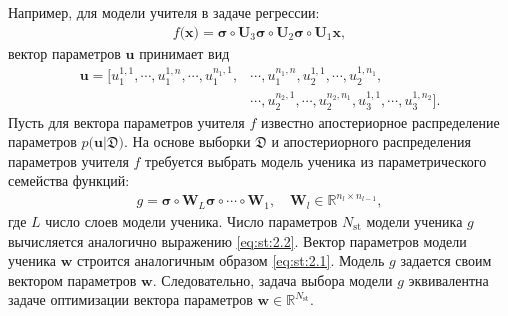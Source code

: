 Например, для модели учителя в задаче регрессии:
\[
\label{eq:st:3}
\begin{aligned}
f\bigr(\mathbf{x}\bigr) = \bm{\sigma} \circ \mathbf{U}_3 \bm{\sigma} \circ \mathbf{U}_2\bm{\sigma}\circ \mathbf{U}_1\mathbf{x},
\end{aligned}
\]
вектор параметров $\mathbf{u}$ принимает вид
\[
\label{eq:st:4}
\begin{aligned}
\mathbf{u} = \bigr[u_1^{1,1}, \cdots, u_1^{1,n},
                                               \cdots, 
                             u_1^{n_1,1}, &\cdots, u_1^{n_1,n},  
                             u_2^{1, 1}, \cdots, u_2^{1, n_1}, \\
                                                & \cdots, 
                            u_2^{n_2, 1}, \cdots, u_2^{n_2, n_1},
                            u_3^{1, 1}, \cdots, u_3^{1, n_2}\bigr].
\end{aligned}
\]
Пусть для вектора параметров учителя $f$ известно апостериорное распределение параметров $p\bigr(\mathbf{u}|\mathfrak{D}\bigr)$. 
На основе выборки $\mathfrak{D}$ и апостериорного распределения параметров учителя $f$ требуется выбрать модель ученика из параметрического семейства функций:
\[
\label{eq:st:5}
\begin{aligned}
g = \bm{\sigma} \circ \mathbf{W}_L\bm{\sigma}  \circ \cdots \circ \mathbf{W}_1, \quad \mathbf{W}_l \in \mathbb{R}^{n_l \times n_{l-1}},
\end{aligned}
\]
где $L$ число слоев модели ученика.
Число параметров $N_{\text{st}}$ модели ученика $g$ вычисляется аналогично выражению \eqref{eq:st:2.2}.
Вектор параметров модели ученика $\mathbf{w}$ строится аналогичным образом \eqref{eq:st:2.1}.
Модель $g$ задается своим вектором параметров $\mathbf{w}$.
Следовательно, задача выбора модели $g$ эквивалентна задаче оптимизации вектора параметров $\mathbf{w}\in\mathbb{R}^{N_{\text{st}}}$.

